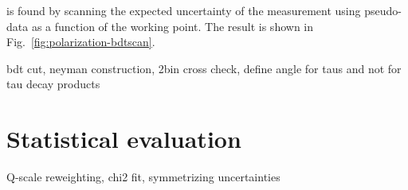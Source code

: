 is found by scanning the expected uncertainty of the measurement using pseudo-data as a function of the working point. The result is shown in Fig.~\ref{fig:polarization-bdtscan}. 




bdt cut, neyman construction, 2bin cross check, define angle for taus and not for tau decay products






\section{Statistical evaluation}

Q-scale reweighting, chi2 fit, symmetrizing  uncertainties

